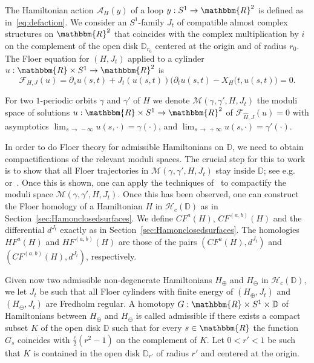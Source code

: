 \documentclass[AHL,Unicode,longabstracts,published]{cedram}
\newcommand{\R}{\mathbbm{R}}
\newcommand{\D}{\mathbb{D}}
\newcommand{\clA}{\mathcal{A}}
\newcommand{\clF}{\mathcal{F}}
\newcommand{\clM}{\mathcal{M}}
\newcommand{\clH}{\mathcal{H}}
\begin{document}
The Hamiltonian action $\clA_{{H}}(y)$ of a loop $y:S^1 \to \R^2$ is defined as in~\eqref{eq:defaction}. We consider an $S^1$-family $J_t$ of compatible almost complex structures on $\R^2$ that coincides with the complex multiplication by ${i}$ on the complement of the open disk $\D_{r_0}$ centered at the origin and of radius ${r_0}$. The Floer equation for $(H,J_t)$ applied to a cylinder $u: \R \times S^1 \to \R^2$ is
\[
\clF_{{H},J}(u) = \partial_s u(s,t) + J_t(u(s,t))\big(\partial_t u (s,t) - X_{{H}}(t,u(s,t)\big)=0.
\]

For two $1$-periodic orbits $\gamma$ and $\gamma'$ of ${H}$ we denote $\clM(\gamma, \gamma', {H},J_t)$ the moduli space of solutions $u: \R \times S^1 \to \R^2$ of $\clF_{\widehat{H},J}(u) = 0$ with asymptotics $
\lim_{s\,\to\,-\infty}u(s,\cdot) = \gamma(\cdot)$, and $\lim_{s\,\to\,+\infty}u(s,\cdot) = \gamma'(\cdot)$.


In order to do Floer theory for admissible Hamiltonians on $\D$, we need to obtain compactifications of the relevant moduli spaces. The crucial step for this to work is to show that all Floer trajectories in $\clM(\gamma, \gamma', {H},J_t)$ stay inside $\D$; see e.g.~\cite{FloerHofersymphom} or~\cite[Lemma~2.2]{CieliebakOanceaSH}. Once this is shown, one can apply the techniques of~\cite{Floer} to compactify the moduli space $\clM(\gamma, \gamma', {H},J_t)$. Once this has been observed, one can construct the Floer homology of a Hamiltonian $H$ in $\clH_c(\D)$ as in Section~\ref{sec:Hamonclosedsurfaces}. We define $CF^a(H)$, $CF^{(a,b)}(H)$ and the differential $d^{J_t}$ exactly as in Section~\ref{sec:Hamonclosedsurfaces}. The homologies $HF^{a}(H)$ and $HF^{(a,b)}(H)$ are those of the pairs $(CF^a(H),d^{J_t}) $ and $(CF^{(a,b)}(H),d^{J_t})$, respectively.



Given now two admissible non-degenerate Hamiltonians $H_{\oplus}$ and $H_{\ominus}$ in $\clH_c(\D)$, we let $J_{t}$ be such that all Floer cylinders with finite energy of $(H_\oplus,J_t)$ and $(H_\ominus,J_t)$ are Fredholm regular. A homotopy $G: \R \times S^1 \times \D$ of Hamiltonians between $H_{\oplus}$ and $H_{\ominus}$ is called admissible if there exists a compact subset $K$ of the open disk $\D$ such that for every $s\in \R$ the function $G_s$ coincides with $\frac{c}{2}(r^2 - 1)$ on the complement of $K$. Let $0<r'<1$ be such that $K$ is contained in the open disk $\D_{r'}$ of radius $r'$ and centered at the origin.
\end{document}
